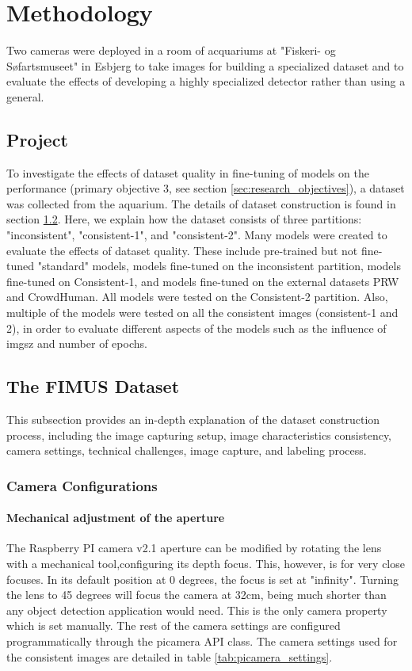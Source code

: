 \section{Methodology}
\label{sec:methodology}
Two cameras were deployed in a room of acquariums at "Fiskeri- og Søfartsmuseet" in Esbjerg to take images for building a specialized dataset and to evaluate the effects of developing a highly specialized detector rather than using a general.

\subsection{Project}
To investigate the effects of dataset quality in fine-tuning of models on the performance (primary objective 3, see section \ref{sec:research_objectives}), a dataset was collected from the aquarium. The details of dataset construction is found in section \ref{sec:dataset_construction}. Here, we explain how the dataset consists of three partitions: "inconsistent", "consistent-1", and "consistent-2". Many models were created to evaluate the effects of dataset quality. These include pre-trained but not fine-tuned "standard" models, models fine-tuned on the inconsistent partition, models fine-tuned on Consistent-1, and models fine-tuned on the external datasets PRW and CrowdHuman. All models were tested on the Consistent-2 partition. Also, multiple of the models were tested on all the consistent images (consistent-1 and 2), in order to evaluate different aspects of the models such as the influence of imgsz and number of epochs.


\subsection{The FIMUS Dataset}
\label{sec:dataset_construction}
This subsection provides an in-depth explanation of the dataset construction process, including the image capturing setup, image characteristics consistency, camera settings, technical challenges, image capture, and labeling process.

\subsubsection{Camera Configurations}
\paragraph{Mechanical adjustment of the aperture}
The Raspberry PI camera v2.1 aperture can be modified by rotating the lens with a mechanical tool,configuring its depth focus. This, however, is for very close focuses. In its default position at 0 degrees, the focus is set at "infinity". Turning the lens to 45 degrees will focus the camera at 32cm, being much shorter than any object detection application would need. This is the only camera property which is set manually. The rest of the camera settings are configured programmatically through the picamera API class. The camera settings used for the consistent images are detailed in table \ref{tab:picamera_settings}.

